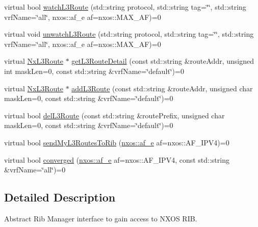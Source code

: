 \begin{DoxyCompactItemize}
virtual bool \mbox{\hyperlink{classnxos_1_1_nx_rib_mgr_ab6749ea02f53fc8b2f6cdba21bbc335d}{watch\+L3\+Route}} (std\+::string protocol, std\+::string tag=\char`\"{}\char`\"{}, std\+::string vrf\+Name=\char`\"{}all\char`\"{}, nxos\+::af\+\_\+e af=nxos\+::\+M\+A\+X\+\_\+\+AF)=0
\item 
virtual void \mbox{\hyperlink{classnxos_1_1_nx_rib_mgr_a1dc61ed1d830f50ea947707576d75b99}{unwatch\+L3\+Route}} (std\+::string protocol, std\+::string tag=\char`\"{}\char`\"{}, std\+::string vrf\+Name=\char`\"{}all\char`\"{}, nxos\+::af\+\_\+e af=nxos\+::\+M\+A\+X\+\_\+\+AF)=0
\item 
virtual \mbox{\hyperlink{classnxos_1_1_nx_l3_route}{Nx\+L3\+Route}} $\ast$ \mbox{\hyperlink{classnxos_1_1_nx_rib_mgr_a7bf169a5f8d7b30090c4b3c67468ac18}{get\+L3\+Route\+Detail}} (const std\+::string \&route\+Addr, unsigned int mask\+Len=0, const std\+::string \&vrf\+Name=\char`\"{}default\char`\"{})=0
\item 
virtual \mbox{\hyperlink{classnxos_1_1_nx_l3_route}{Nx\+L3\+Route}} $\ast$ \mbox{\hyperlink{classnxos_1_1_nx_rib_mgr_a59da8782bb5d41a130c8c238abc92bc3}{add\+L3\+Route}} (const std\+::string \&route\+Addr, unsigned char mask\+Len=0, const std\+::string \&vrf\+Name=\char`\"{}default\char`\"{})=0
\item 
virtual bool \mbox{\hyperlink{classnxos_1_1_nx_rib_mgr_a6d838df92cbcc60bf81dabc31b2dd5b1}{del\+L3\+Route}} (const std\+::string \&route\+Prefix, unsigned char mask\+Len=0, const std\+::string \&vrf\+Name=\char`\"{}default\char`\"{})=0
\item 
virtual bool \mbox{\hyperlink{classnxos_1_1_nx_rib_mgr_a0eb60de76f9a6b028350b8144a590e19}{send\+My\+L3\+Routes\+To\+Rib}} (\mbox{\hyperlink{nx__common_8h_a3a667f48b94db10aa398940dc5bf72d7}{nxos\+::af\+\_\+e}} af=nxos\+::\+A\+F\+\_\+\+I\+P\+V4)=0
\item 
virtual bool \mbox{\hyperlink{classnxos_1_1_nx_rib_mgr_a7edd313ab7852713469d84ac588cd08d}{converged}} (\mbox{\hyperlink{nx__common_8h_a3a667f48b94db10aa398940dc5bf72d7}{nxos\+::af\+\_\+e}} af=nxos\+::\+A\+F\+\_\+\+I\+P\+V4, const std\+::string \&vrf\+Name=\char`\"{}all\char`\"{})=0
\end{DoxyCompactItemize}


\subsection{Detailed Description}
Abstract Rib Manager interface to gain access to N\+X\+OS R\+IB. 

